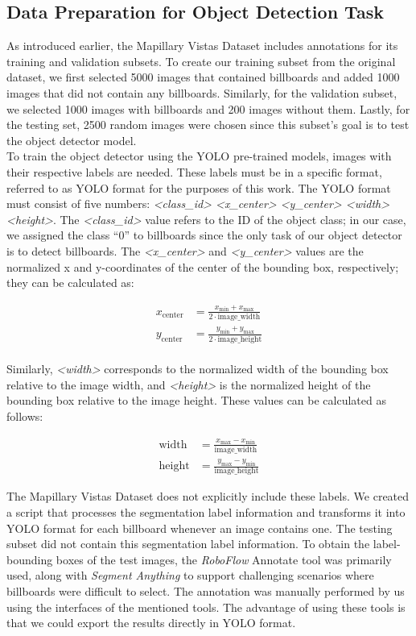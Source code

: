\subsection{Data Preparation for Object Detection Task}\label{sec:preprocessingdetection}

As introduced earlier, the Mapillary Vistas Dataset includes annotations for its training and validation subsets. To create our training subset from the original dataset, we first selected 5000 images that contained billboards and added 1000 images that did not contain any billboards. Similarly, for the validation subset, we selected 1000 images with billboards and 200 images without them. Lastly, for the testing set, 2500 random images were chosen since this subset's goal is to test the object detector model.\\

To train the object detector using the YOLO pre-trained models, images with their respective labels are needed. These labels must be in a specific format, referred to as YOLO format for the purposes of this work. The YOLO format must consist of five numbers: \textit{<class\_id> <x\_center> <y\_center> <width> <height>}. The \textit{<class\_id>} value refers to the ID of the object class; in our case, we assigned the class “0” to billboards since the only task of our object detector is to detect billboards. The \textit{<x\_center>} and \textit{<y\_center>} values are the normalized x and y-coordinates of the center of the bounding box, respectively; they can be calculated as:

\begin{align}
x_{\text{center}} &= \frac{x_{\text{min}} + x_{\text{max}}}{2 \cdot \text{image\_width}} \\
y_{\text{center}} &= \frac{y_{\text{min}} + y_{\text{max}}}{2 \cdot \text{image\_height}}
\end{align} \\

Similarly, \textit{<width>} corresponds to the normalized width of the bounding box relative to the image width, and \textit{<height>} is the normalized height of the bounding box relative to the image height. These values can be calculated as follows:

\begin{align}
\text{width} &= \frac{x_{\text{max}} - x_{\text{min}}}{\text{image\_width}} \\
\text{height} &= \frac{y_{\text{max}} - y_{\text{min}}}{\text{image\_height}}
\end{align}

The Mapillary Vistas Dataset does not explicitly include these labels. We created a script that processes the segmentation label information and transforms it into YOLO format for each billboard whenever an image contains one. The testing subset did not contain this segmentation label information. To obtain the label-bounding boxes of the test images, the \textit{RoboFlow} Annotate tool was primarily used, along with \textit{Segment Anything} to support challenging scenarios where billboards were difficult to select. The annotation was manually performed by us using the interfaces of the mentioned tools. The advantage of using these tools is that we could export the results directly in YOLO format.